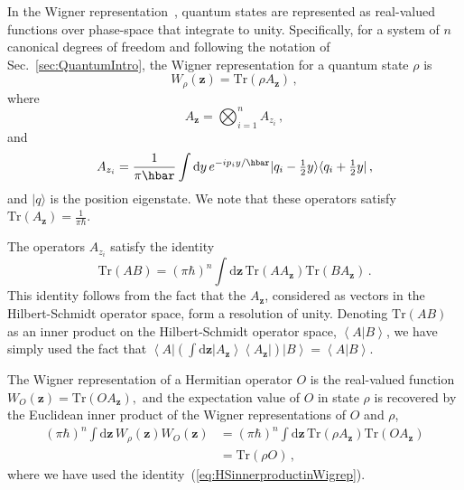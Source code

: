 \documentclass[pra,superscriptaddress,nofootinbib,12pt]{revtex4-2}
\begin{document}
In the Wigner representation~\cite{Wig32,GardinerZoller}, quantum states are represented as real-valued functions over phase-space that integrate to unity.  Specifically, for a system of $n$ canonical degrees of freedom and following the notation of Sec.~\ref{sec:QuantumIntro}, the Wigner representation for a quantum state $\rho$ is
\begin{equation}
  W_{\rho}(\mathbf{z})=\mathrm{Tr}(\rho A_{\mathbf{z}})\,,
\end{equation}
where
\begin{equation}
  A_{\mathbf{z}}=\bigotimes_{i=1}^{n}A_{z_{i}}\,,
\end{equation}
and
\begin{equation}
  A_{z_{i}}= \frac{1}{\pi \hbar} \int {\rm d}y\, e^{-ip_{i}y/\hbar} | q_{i}-
  \tfrac{1}{2}y \rangle \langle q_{i}+\tfrac{1}{2}y| \,,
\end{equation}
and $|q\rangle$ is the position eigenstate.  We note that these operators satisfy $\mathrm{Tr}(A_{\mathbf{z}})=\frac{1}{\pi \hbar}$.

The operators $A_{z_i}$ satisfy the identity
\begin{equation}
  \label{eq:HSinnerproductinWigrep}
  \mathrm{Tr}\left( AB\right) = (\pi \hbar)^n \int \mathrm{d}\mathbf{z}\,\mathrm{Tr}\left( AA_{
  \mathbf{z}}\right) \mathrm{Tr}(BA_{\mathbf{z}})\,.
\end{equation}
This identity follows from the fact that the $A_{\mathbf{z}}$,
considered as vectors in the Hilbert-Schmidt operator space, form a
resolution of unity.  Denoting $\mathrm{Tr}(AB)$ as an inner
product on the Hilbert-Schmidt operator space, $\left\langle A|B\right\rangle$, we have simply used the
fact that $\left\langle A\right\vert (\int \mathrm{d}\mathbf{z}\left\vert A_{
\mathbf{z}}\right\rangle \left\langle A_{\mathbf{z}}\right\vert)
\left\vert B\right\rangle =\left\langle A|B\right\rangle$.

The Wigner representation of a Hermitian operator $O$ is the real-valued function
$W_{O}(\mathbf{z})=\mathrm{Tr}(O A_{\mathbf{z}}),$ and the expectation value of $O$ in state $\rho$ is recovered by the Euclidean inner product of the Wigner representations of $O$ and $\rho$,
\begin{align}
  \label{eq:WignerObservables}
  (\pi \hbar)^n \int \mathrm{d}\mathbf{z}\,W_{\rho}(\mathbf{z})W_{O}(\mathbf{z})
  &=(\pi \hbar)^n \int \mathrm{d}\mathbf{z}\,\mathrm{Tr}(\rho A_{\mathbf{z}})
  \mathrm{Tr}(OA_{\mathbf{z}}) \nonumber \\
  &=\mathrm{Tr}(\rho O)\,,
\end{align}
where we have used the identity~(\ref{eq:HSinnerproductinWigrep}).
\end{document}
